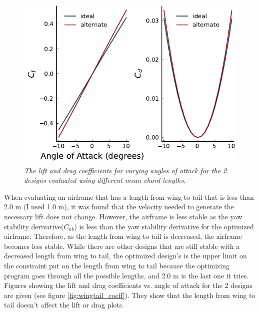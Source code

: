 \documentclass[journal]{new-aiaa}
\begin{document}
	\begin{figure}[H]
		\centering
		\includegraphics{../graphics/chord_coeff.pdf}
		\caption{\emph{The lift and drag coefficients for varying angles of attack for the 2 designs evaluated using different mean chord lengths.}}
		\label{fig:chord_coeff}
	\end{figure}
	
	When evaluating an airframe that has a length from wing to tail that is less than 2.0 m (I used 1.0 m), it was found that the velocity needed to generate the necessary lift does not change. However, the airframe is less stable as the yaw stability derivative(\(C_{nb}\)) is less than the yaw stability derivative for the optimized airframe. Therefore, as the length from wing to tail is decreased, the airframe becomes less stable. While there are other designs that are still stable with a decreased length from wing to tail, the optimized design's is the upper limit on the constraint put on the length from wing to tail because the optimizing program goes through all the possible lengths, and 2.0 m is the last one it tries.\\
	
	Figures showing the lift and drag coefficients vs. angle of attack for the 2 designs are given (see figure \ref{fig:wingtail_coeff}). They show that the length from wing to tail doesn't affect the lift or drag plots.\\
	
\end{document}
